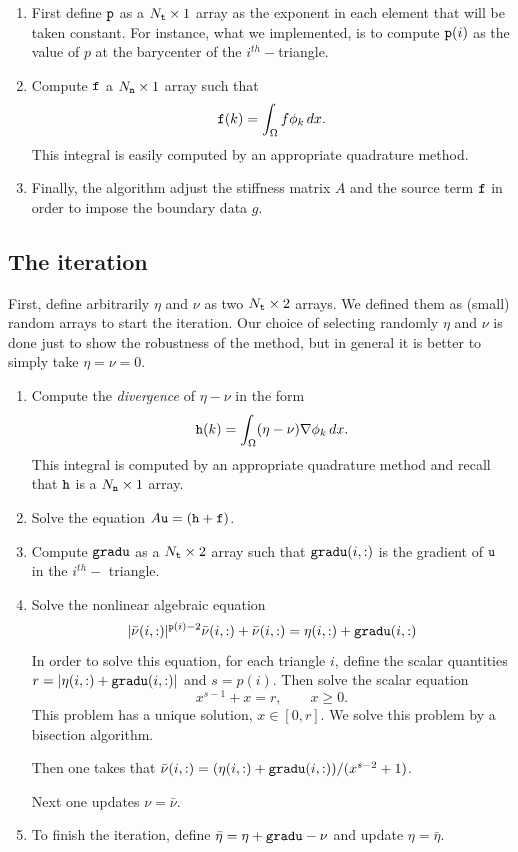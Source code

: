 \documentclass[11pt]{amsart}
\theoremstyle{remark}
\theoremstyle{definition}
\numberwithin{equation}{section}
\begin{document}
\begin{enumerate} 
\item First define ${\tt p}$ as a $N_{\tt t}\times 1$ array as the exponent in each element that will be taken constant. For instance, what we implemented, is to compute ${\tt p}(i)$ as the value of $p$ at the barycenter of the $i^{th}-$triangle.

\item Compute ${\tt f}$ a $N_{\tt n}\times 1$ array such that 
$$
{\tt f}(k) = \int_\Omega f\phi_k\, dx.
$$
This integral is easily computed by an appropriate quadrature method.

\item Finally, the algorithm adjust the stiffness matrix $A$ and the source term ${\tt f}$ in order to impose the boundary data $g$.

\end{enumerate}

\subsection{The iteration}

First, define arbitrarily $\eta$ and $\nu$ as two $N_{\tt t}\times 2$ arrays. We defined them as (small) random arrays to start the iteration. Our choice of selecting randomly $\eta$ and $\nu$ is done just to show the robustness of the method, but in general  it is better to simply take $\eta=\nu=0$.
\begin{enumerate}
\item Compute the {\em divergence} of $\eta-\nu$ in the form
$$
{\tt h}(k) = \int_\Omega (\eta-\nu)\nabla \phi_k\, dx.
$$
This integral is computed by an appropriate quadrature method and recall that ${\tt h}$ is a $N_{\tt n}\times 1$ array.

\item Solve the equation $A{\tt u} = ({\tt h} + {\tt f})$.

\item Compute ${\tt gradu}$ as a $N_{\tt t}\times 2$ array such that ${\tt gradu}(i,:)$ is the gradient of ${\tt u}$ in the $i^{th}-$ triangle.

\item Solve the nonlinear algebraic equation
$$
|\bar \nu(i,:)|^{{\tt p}(i)-2} \bar \nu(i,:) + \bar \nu(i,:) = \eta(i,:) + {\tt gradu}(i,:)
$$
In order to solve this equation, for each triangle $i$, 
define the scalar quantities $r=|\eta(i,:) + {\tt gradu}(i,:)|$ and $s=p(i)$. Then solve the scalar equation
$$
x^{s-1} + x = r,\qquad x\ge 0.
$$
This problem has a unique solution, $x\in [0,r]$. We solve this problem by a bisection algorithm.

Then one takes that $\bar \nu(i,:) = (\eta(i,:) + {\tt gradu}(i,:))/(x^{s-2}+1)$.

Next one updates $\nu = \bar\nu$.

\item To finish the iteration, define $\bar\eta = \eta + {\tt gradu} - \nu$ and update $\eta=\bar\eta$.
\end{enumerate}
\end{document}
